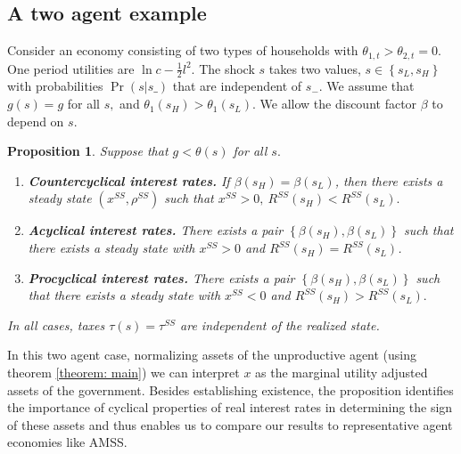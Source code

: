 \documentclass[thmsb,11pt]{article}
\newtheorem{proposition}{Proposition}
\begin{document}
\subsection{A two agent example}\label{sec: 2 agent example}

\smallskip Consider an economy consisting of  two types of households with $%
\theta _{1,t}>\theta _{2,t}=0$. One period utilities are $\ln c-\frac{1}{2}%
l^{2}.$ The shock $s$  takes  two values, $s\in \left\{
s_{L},s_{H}\right\} $ with probabilities $\Pr \left( s|s\_\right) $ that are
independent of $s_{-}.$ We assume that $g\left( s\right) =g$ for all $s,$
and $\theta _{1}\left( s_{H}\right) >\theta _{1}\left( s_{L}\right) .$ We allow the discount factor $\beta $ to depend on  $s.$

\smallskip

\begin{proposition}
\label{prop: long run forces}\smallskip Suppose that $g<\theta (s)$ for all $%
s.$

\begin{enumerate}
\item \textbf{Countercyclical interest rates.} If $\beta \left( s_{H}\right) =\beta \left( s_{L}\right)$, then
there exists a steady state $\left( x^{SS},\rho ^{SS}\right) $ such that $%
x^{SS}>0,\ R^{SS}\left( s_{H}\right) <R^{SS}\left( s_{L}\right) .$
\item \textbf{Acyclical interest rates.}  There exists a pair $\left\{ \beta \left( s_{H}\right) ,\beta \left( s_{L}\right)
\right\} $ such that there exists a steady state with $x^{SS}>0$ and $R^{SS}\left(
s_{H}\right) =R^{SS}\left( s_{L}\right)$.
\item \textbf{Procyclical interest rates.} There exists a pair  $\left\{ \beta \left( s_{H}\right) ,\beta \left( s_{L}\right)
\right\} $ such that there exists a steady state with $x^{SS}<0$ and  $R^{SS}\left( s_{H}\right) >R^{SS}\left( s_{L}\right) .$
\end{enumerate}
In all cases, taxes $\tau(s)=\tau^{SS}$ are independent of the realized state. 
\end{proposition}


In this two agent case, normalizing assets of the unproductive agent (using theorem \ref{theorem: main}) we can interpret $x$ as the marginal utility adjusted assets of the government. Besides establishing existence, the proposition identifies the importance of cyclical properties of real interest rates in determining the sign of these assets and thus enables us to compare our results to representative agent economies like AMSS.
\end{document}
